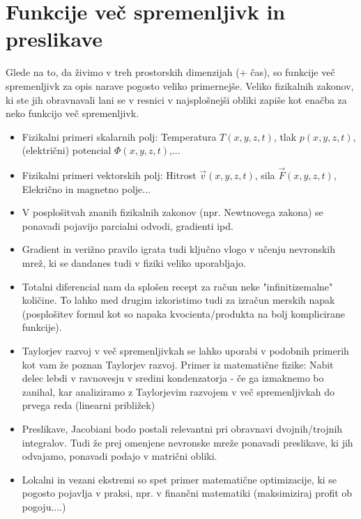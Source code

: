 \documentclass[12pt]{article}
\begin{document}
\section*{Funkcije več spremenljivk in preslikave}
Glede na to, da živimo v treh prostorskih dimenzijah (+ čas), so funkcije več spremenljivk za opis narave pogosto veliko primernejše. Veliko fizikalnih zakonov, ki ste jih obravnavali lani se v resnici v najsplošnejši obliki zapiše kot enačba za neko funkcijo več spremenljivk.
\begin{itemize}[leftmargin=1.5em]
    \item Fizikalni primeri skalarnih polj: Temperatura $T(x,y,z,t)$, tlak $p(x,y,z,t)$, (električni) potencial $\Phi (x,y,z,t)$,...
    \item Fizikalni primeri vektorskih polj: Hitrost $\vec{v}(x,y,z,t)$, sila $\vec{F}(x,y,z,t)$, Elekrično in magnetno polje...
    \item V posplošitvah znanih fizikalnih zakonov (npr. Newtnovega zakona) se ponavadi pojavijo parcialni odvodi, gradienti ipd.
    \item Gradient in verižno pravilo igrata tudi ključno vlogo v učenju nevronskih mrež, ki se dandanes tudi v fiziki veliko uporabljajo.
    \item Totalni diferencial nam da splošen recept za račun neke "{}infinitizemalne"{} količine. To lahko med drugim izkoristimo tudi za izračun merskih napak (posplošitev formul kot so napaka kvocienta/produkta na bolj komplicirane funkcije).
    \item Taylorjev razvoj v več spremenljivkah se lahko uporabi v podobnih primerih kot vam že poznan Taylorjev razvoj. Primer iz matematične fizike: Nabit delec lebdi v ravnovesju v sredini kondenzatorja - če ga izmaknemo bo zanihal, kar analiziramo z Taylorjevim razvojem v več spremenljivkah do prvega reda (linearni približek)
    \item Preslikave, Jacobiani bodo postali relevantni pri obravnavi dvojnih/trojnih integralov. Tudi že prej omenjene nevronske mreže ponavadi preslikave, ki jih odvajamo, ponavadi podajo v matrični obliki.
    \item Lokalni in vezani ekstremi so spet primer matematične optimizacije, ki se pogosto pojavlja v praksi, npr. v finančni matematiki (maksimiziraj profit ob pogoju....)
\end{itemize}
\end{document}

